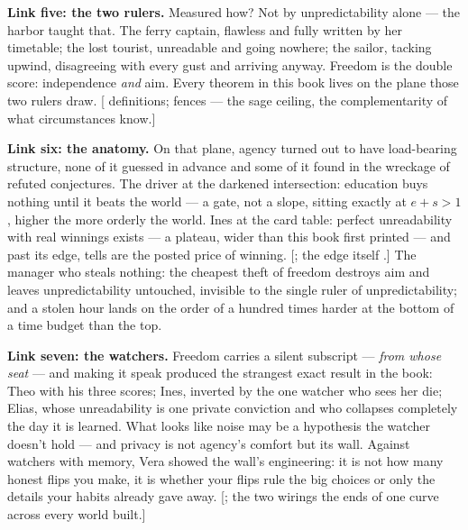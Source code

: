 \textbf{Link five: the two rulers.} Measured how? Not by unpredictability
alone --- the harbor taught that. The ferry captain, flawless and
fully written by her timetable; the lost tourist, unreadable and
going nowhere; the sailor, tacking upwind, disagreeing with every
gust and arriving anyway. Freedom is the double score: independence
\emph{and} aim. Every theorem in this book lives on the plane those two
rulers draw. {[} definitions;  fences --- the sage ceiling,
the complementarity of what circumstances know.{]}

\textbf{Link six: the anatomy.} On that plane, agency turned out to have
load-bearing structure, none of it guessed in advance and some of it
found in the wreckage of refuted conjectures. The driver at the
darkened intersection: education buys nothing until it beats the
world --- a gate, not a slope, sitting exactly at \(e + s > 1\), higher
the more orderly the world.  Ines at the card table:
perfect unreadability with real winnings exists --- a plateau, wider
than this book first printed --- and past its edge, tells are the posted
price of winning. {[}; the edge itself .{]}
The manager who steals nothing: the cheapest theft of freedom
destroys aim and leaves unpredictability untouched, invisible to
the single ruler of unpredictability; and a stolen hour lands
on the order of a hundred times harder at the bottom of a time budget
than the top. 

\textbf{Link seven: the watchers.} Freedom carries a silent subscript ---
\emph{from whose seat} --- and making it speak produced the strangest exact
result in the book: Theo with his three scores; Ines, inverted by the one
watcher who sees her die; Elias, whose unreadability is one private
conviction and who collapses completely the day it is learned. What
looks like noise may be a hypothesis the watcher doesn't hold --- and
privacy is not agency's comfort but its wall. Against watchers with
memory, Vera showed the wall's engineering: it is not how many honest
flips you make, it is whether your flips rule the big choices or only
the details your habits already gave away. {[}; the two wirings
the ends of one curve across every world built.{]}

